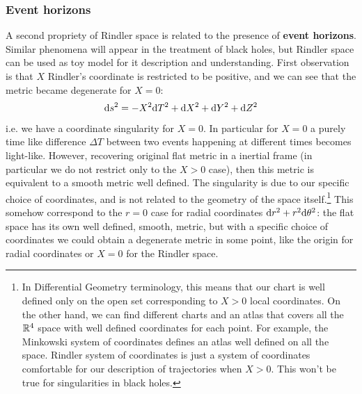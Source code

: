 \documentclass[../main/main.tex]{subfiles}
\begin{document}
\subsubsection{Event horizons}
A second propriety of Rindler space is related to the presence of \textbf{event horizons}. Similar phenomena will appear in the treatment of black holes, but Rindler space can be used as toy model for it description and understanding. First observation is that $X$ Rindler's coordinate is restricted to be positive, and we can see that the metric became degenerate for $X=0$:
\[\textup{d} s^2=-X^2\textup{d} T^2+\textup{d} X^2+\textup{d} Y^2+\textup{d} Z^2\]
i.e. we have a coordinate singularity for $X=0$. In particular for $X=0$ a purely time like difference $\Delta T$ between two events happening at different times becomes light-like. However, recovering original flat metric in a inertial frame (in particular we do not restrict only to the  $X>0$ case), then this metric is equivalent to a smooth metric well defined. The singularity is due to our specific choice of coordinates, and is not related to the geometry of the space itself.\footnote{In Differential Geometry terminology, this means that our chart is well defined only on the open set corresponding to $X>0$ local coordinates. On the other hand, we can find different charts and an atlas that covers all the $\mathbb{R}^4$ space with well defined coordinates for each point. For example, the Minkowski system of coordinates defines an atlas well defined on all the space. Rindler system of coordinates is just a system of coordinates comfortable for our description of trajectories when $X>0$. This won't be true for singularities in black holes.} This somehow correspond to the $r=0$ case for radial coordinates $\textup{d} r^2+r^2\textup{d}\theta^2$: the flat space has its own well defined, smooth, metric, but with a specific choice of coordinates we could obtain a degenerate metric in some point, like the origin for radial coordinates or $X=0$ for the Rindler space. 
\end{document}

